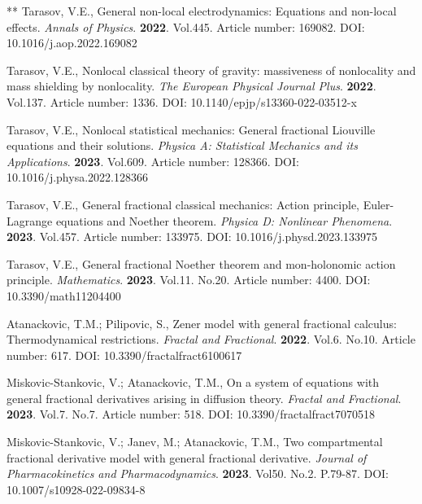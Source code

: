 \documentclass[12pt]{article}
\begin{document}
\begin{thebibliography}{**}
 Tarasov, V.E., 
General non-local electrodynamics: Equations and non-local effects.
\textit{Annals of Physics}. 
\textbf{2022}. Vol.445. Article number: 169082. 
DOI: 10.1016/j.aop.2022.169082

 Tarasov, V.E., 
Nonlocal classical theory of gravity: massiveness of nonlocality and mass shielding by nonlocality. 
\textit{The European Physical Journal Plus}.
\textbf{2022}. Vol.137. Article number: 1336.
DOI: 10.1140/epjp/s13360-022-03512-x

 Tarasov, V.E., 
Nonlocal statistical mechanics: General fractional Liouville equations and their solutions. 
\textit{Physica A: Statistical Mechanics and its Applications}. 
\textbf{2023}. Vol.609. Article number: 128366. 
DOI: 10.1016/j.physa.2022.128366

 Tarasov, V.E., 
General fractional classical mechanics: Action principle, Euler-Lagrange equations and Noether theorem.
\textit{Physica D: Nonlinear Phenomena}. 
\textbf{2023}. Vol.457. Article number: 133975.
DOI: 10.1016/j.physd.2023.133975

 Tarasov, V.E., 
General fractional Noether theorem and mon-holonomic action principle. 
\textit{Mathematics}. 
\textbf{2023}. Vol.11. No.20. Article number: 4400. 
DOI: 10.3390/math11204400 


 Atanackovic, T.M.; Pilipovic, S.,
Zener model with general fractional calculus: Thermodynamical restrictions.
\textit{Fractal and Fractional}.
\textbf{2022}. Vol.6. No.10. Article number: 617.
DOI: 10.3390/fractalfract6100617

Miskovic-Stankovic, V.; Atanackovic, T.M., 
On a system of equations with general fractional derivatives
arising in diffusion theory. 
\textit{Fractal and Fractional}. 
\textbf{2023}. Vol.7. No.7. Article number: 518. 
DOI: 10.3390/fractalfract7070518

Miskovic-Stankovic, V.; Janev, M.; Atanackovic, T.M., 
Two compartmental fractional derivative model with general fractional derivative. 
\textit{Journal of Pharmacokinetics and Pharmacodynamics}. \textbf{2023}. Vol50. No.2. P.79-87. 
DOI: 10.1007/s10928-022-09834-8



\end{thebibliography}
\end{document}
